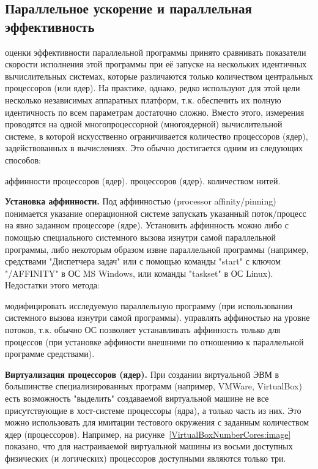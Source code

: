{ %
	\subsection{Параллельное ускорение и параллельная эффективность}
	\Large{} оценки эффективности параллельной программы принято сравнивать показатели скорости исполнения этой программы при её запуске на нескольких идентичных вычислительных системах, которые различаются только количеством центральных процессоров (или ядер). На практике, однако, редко используют для этой цели несколько независимых аппаратных платформ, т.к. обеспечить их полную идентичность по всем параметрам достаточно сложно. Вместо этого, измерения проводятся на одной многопроцессорной (многоядерной) вычислительной системе, в которой искусственно ограничивается количество процессоров (ядер), задействованных в вычислениях. Это обычно достигается одним из следующих способов:
	\begin{itemize}
		 аффинности процессоров (ядер).
		 процессоров (ядер).
		 количеством нитей.
	\end{itemize}
	\textbf{Установка аффинности.} Под аффинностью (processor affinity/pinning) понимается указание операционной системе запускать указанный поток/процесс на явно заданном процессоре (ядре). Установить аффинность можно либо с помощью специального системного вызова изнутри самой параллельной программы, либо некоторым образом извне параллельной программы (например, средствами "Диспетчера задач" или с помощью команды "start" с ключом "/AFFINITY" в ОС MS Windows, или команды "taskset" в ОС Linux). Недостатки этого метода:
	\begin{itemize}
		 модифицировать исследуемую параллельную программу (при использовании системного вызова изнутри самой программы).
		 управлять аффиностью на уровне потоков, т.к. обычно ОС позволяет устанавливать аффинность только для процессов (при установке аффиности внешними по отношению к параллельной программе средствами).
	\end{itemize}
	\textbf{Виртуализация процессоров (ядер).} При создании виртуальной ЭВМ в большинстве специализированных программ (например, VMWare, VirtualBox) есть возможность "выделить" создаваемой виртуальной машине не все присутствующие в хост-системе процессоры (ядра), а только часть из них. Это можно использовать для имитации тестового окружения с заданным количеством ядер (процессоров). Например, на рисунке~\ref{VirtualBoxNumberCores:image} показано, что для настраиваемой виртуальной машины из восьми доступных физических (и логических) процессоров доступными являются только три.
}
